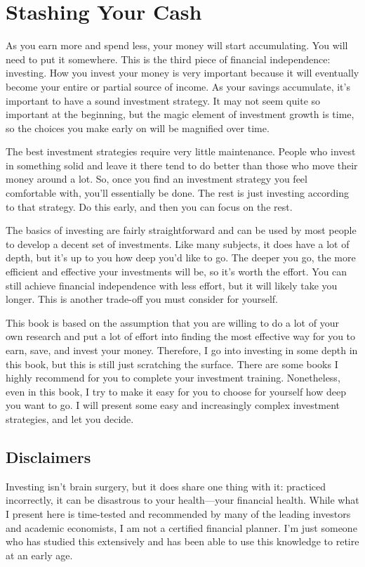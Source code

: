 \chapter{Stashing Your Cash}

As you earn more and spend less, your money will start accumulating. You will need to put it somewhere. This is the third piece of financial independence: investing. How you invest your money is very important because it will eventually become your entire or partial source of income. As your savings accumulate, it's important to have a sound investment strategy. It may not seem quite so important at the beginning, but the magic element of investment growth is time, so the choices you make early on will be magnified over time.

The best investment strategies require very little maintenance. People who invest in something solid and leave it there tend to do better than those who move their money around a lot. So, once you find an investment strategy you feel comfortable with, you'll essentially be done. The rest is just investing according to that strategy. Do this early, and then you can focus on the rest.

The basics of investing are fairly straightforward and can be used by most people to develop a decent set of investments. Like many subjects, it does have a lot of depth, but it's up to you how deep you'd like to go. The deeper you go, the more efficient and effective your investments will be, so it's worth the effort. You can still achieve financial independence with less effort, but it will likely take you longer. This is another trade-off you must consider for yourself.

This book is based on the assumption that you are willing to do a lot of your own research and put a lot of effort into finding the most effective way for you to earn, save, and invest your money. Therefore, I go into investing in some depth in this book, but this is still just scratching the surface. There are some books I highly recommend for you to complete your investment training. Nonetheless, even in this book, I try to make it easy for you to choose for yourself how deep you want to go. I will present some easy and increasingly complex investment strategies, and let you decide.

\section{Disclaimers}
Investing isn't brain surgery, but it does share one thing with it: practiced incorrectly, it can be disastrous to your health---your financial health. While what I present here is time-tested and recommended by many of the leading investors and academic economists, I am not a certified financial planner. I'm just someone who has studied this extensively and has been able to use this knowledge to retire at an early age.

